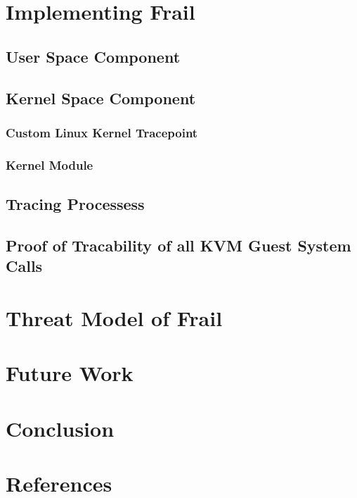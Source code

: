 \documentclass{report}
\begin{document}
\begin{spacing}{1.5}
\chapter{Implementing Frail}

\section{User Space Component}
\section{Kernel Space Component}
\subsection{Custom Linux Kernel Tracepoint}
\subsection{Kernel Module}
\section{Tracing Processess}
\section{Proof of Tracability of all KVM Guest System Calls}

\chapter{Threat Model of Frail}


\chapter{Future Work}

\chapter{Conclusion}

\chapter{References}


\end{spacing}
\end{document}
